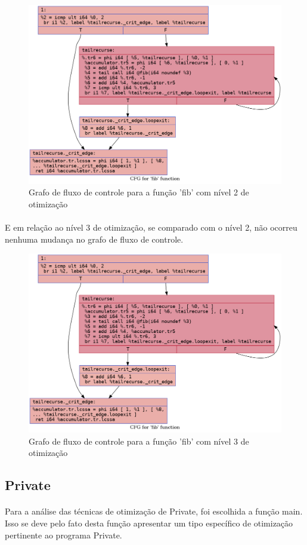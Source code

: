 \documentclass[12pt]{article}
\begin{document}
\begin{figure}
    \centering
    \includegraphics[width=0.5\linewidth]{fib2_.fib_O2.png}
    \caption{Grafo de fluxo de controle para a função 'fib' com nível 2 de otimização}
\end{figure}

\paragraph{}E em relação ao nível 3 de otimização, se comparado com o nível 2, não ocorreu nenhuma mudança no grafo de fluxo de controle.

\begin{figure}
    \centering
    \includegraphics[width=0.5\linewidth]{fib2_.fib_O3.png}
    \caption{Grafo de fluxo de controle para a função 'fib' com nível 3 de otimização}
\end{figure}

\FloatBarrier

\subsection{Private}

\paragraph{}Para a análise das técnicas de otimização de Private, foi escolhida a função main. Isso se deve pelo fato desta função apresentar um tipo específico de otimização pertinente ao programa Private.
\end{document}
